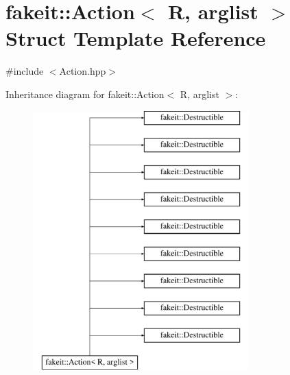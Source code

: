 \hypertarget{structfakeit_1_1Action}{}\section{fakeit\+::Action$<$ R, arglist $>$ Struct Template Reference}
\label{structfakeit_1_1Action}


{\ttfamily \#include $<$Action.\+hpp$>$}

Inheritance diagram for fakeit\+::Action$<$ R, arglist $>$\+:\begin{figure}[H]
\begin{center}
\leavevmode
\includegraphics[height=10.000000cm]{structfakeit_1_1Action}
\end{center}
\end{figure}
